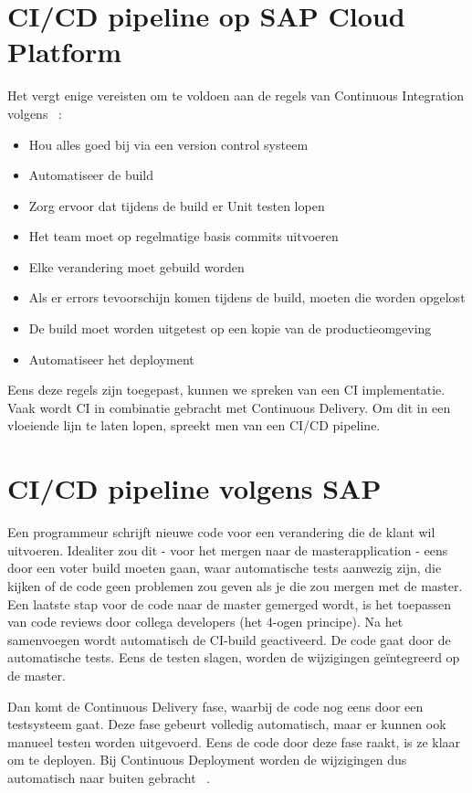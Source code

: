 \section{CI/CD pipeline op SAP Cloud Platform}
\label{sec:ci-cd-op-sap-cloud-platform}
Het vergt enige vereisten om te voldoen aan de regels van Continuous Integration volgens ~\textcite{Kramer2018}:
\begin{itemize}
    \item Hou alles goed bij via een version control systeem
    \item Automatiseer de build
    \item Zorg ervoor dat tijdens de build er Unit testen lopen
    \item Het team moet op regelmatige basis commits uitvoeren
    \item Elke verandering moet gebuild worden
    \item Als er errors tevoorschijn komen tijdens de build, moeten die worden opgelost
    \item De build moet worden uitgetest op een kopie van de productieomgeving
    \item Automatiseer het deployment
\end{itemize}
Eens deze regels zijn toegepast, kunnen we spreken van een CI implementatie.
Vaak wordt CI in combinatie gebracht met Continuous Delivery. Om dit in een vloeiende lijn te laten lopen, spreekt men van een CI/CD pipeline.

\section{CI/CD pipeline volgens SAP}
\label{sec:ci-cd-pipeling-volgens-sap}
Een programmeur schrijft nieuwe code voor een verandering die de klant wil uitvoeren. Idealiter zou dit - voor het mergen naar de masterapplication - eens door een voter build moeten gaan, waar automatische tests aanwezig zijn, die kijken of de code geen problemen zou geven als je die zou mergen met de master. Een laatste stap voor de code naar de master gemerged wordt, is het toepassen van code reviews door collega developers (het 4-ogen principe).
Na het samenvoegen wordt automatisch de CI-build geactiveerd. De code gaat door de automatische tests. Eens de testen slagen, worden de wijzigingen geïntegreerd op de master. 

Dan komt de Continuous Delivery fase, waarbij de code nog eens door een testsysteem gaat. Deze fase gebeurt volledig automatisch, maar er kunnen ook manueel testen worden uitgevoerd. Eens de code door deze fase raakt, is ze klaar om te deployen. 
Bij Continuous Deployment worden de wijzigingen dus automatisch naar buiten gebracht ~\autocite{Kramer2018}.

